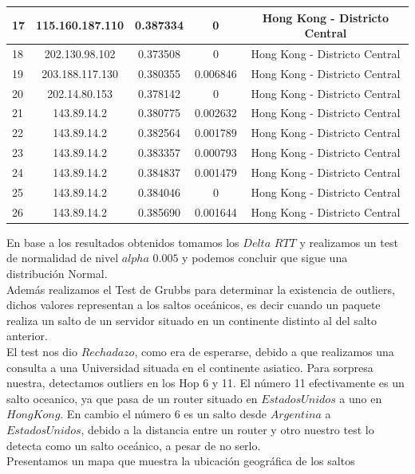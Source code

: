 \begin{tabular}{ | l | c | c | c | c |}
	\hline
		17  &  115.160.187.110 &  0.387334 &  0 & Hong Kong - Districto Central\\
	\hline
		18  &  202.130.98.102  &  0.373508 &  0 & Hong Kong - Districto Central\\
	\hline
		19  &  203.188.117.130 &  0.380355 &  0.006846 & Hong Kong - Districto Central\\
	\hline
		20  &  202.14.80.153  &  0.378142 &  0 & Hong Kong - Districto Central\\
	\hline
		21  &  143.89.14.2  &  0.380775 &  0.002632 & Hong Kong - Districto Central\\
	\hline
		22  &  143.89.14.2  &  0.382564 &  0.001789 & Hong Kong - Districto Central\\
	\hline
		23  &  143.89.14.2  &  0.383357 &  0.000793 & Hong Kong - Districto Central\\
	\hline
		24  &  143.89.14.2  &  0.384837 &  0.001479 & Hong Kong - Districto Central\\
	\hline
		25  &  143.89.14.2  &  0.384046 &  0 & Hong Kong - Districto Central\\
	\hline
		26  &  143.89.14.2  &  0.385690 &  0.001644 & Hong Kong - Districto Central\\
\hline
\end{tabular}

\bigskip

En base a los resultados obtenidos tomamos los $Delta$ $RTT$ y realizamos un test de normalidad de nivel $alpha$ $0.005$ y podemos concluir que sigue una distribución Normal. \\

Además realizamos el Test de Grubbs para determinar la existencia de outliers, dichos valores representan a los saltos oceánicos, es decir cuando un paquete realiza un salto de un servidor situado en un continente distinto al del salto anterior.\\
El test nos dio $Rechadazo$, como era de esperarse, debido a que realizamos una consulta a una Universidad situada en el continente asiatico. Para sorpresa nuestra, detectamos outliers en los Hop 6 y 11. El número 11 efectivamente es un salto oceanico, ya que pasa de un router situado en $Estados Unidos$ a uno en $Hong Kong$. En cambio el número 6 es un salto desde $Argentina$ a $Estados Unidos$, debido a la distancia entre un router y otro nuestro test lo detecta como un salto oceánico, a pesar de no serlo.\\

Presentamos un mapa que muestra la ubicación geográfica de los saltos\\

